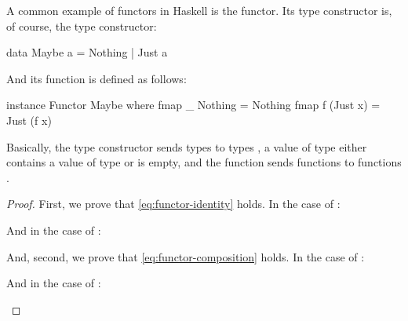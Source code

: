 \begin{example}
  \label{ex:functor-maybe-haskell}


  A common example of functors in Haskell is the 
  functor. Its type constructor is, of course, the 
  type constructor:
  \begin{codehaskell}
data Maybe a = Nothing | Just a
  \end{codehaskell}
  And its  function is defined as follows:
  \begin{codehaskell}
instance Functor Maybe where
  fmap _ Nothing  = Nothing
  fmap f (Just x) = Just (f x)
  \end{codehaskell}
  Basically, the  type constructor sends types
   to types , a value of type
   either contains a value of type
   or is empty, and the  function
  sends functions  to functions .

  \begin{proof}

    First, we prove that \eqref{eq:functor-identity} holds. In the
    case of :
    \begin{steps}
    \end{steps}
    And in the case of :
    \begin{steps}
    \end{steps}
    And, second, we prove that \eqref{eq:functor-composition} holds.
    In the case of :
    \begin{steps}
    \end{steps}
    And in the case of :
    \begin{steps}
    \end{steps}

  \end{proof}

\end{example}

